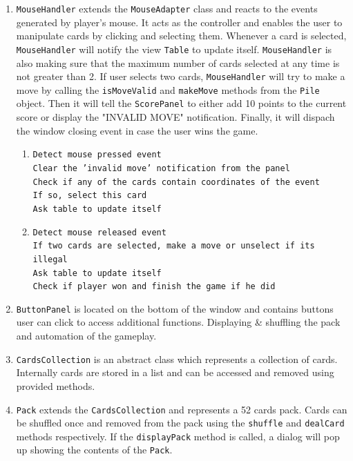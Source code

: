 \documentclass[a4paper, 11pt, titlepage]{article}
\begin{document}
\begin{enumerate}
	\item \texttt{MouseHandler} extends the \texttt{MouseAdapter} class and reacts to
		the events generated by player's mouse. It acts as the controller and enables the 
		user to manipulate cards by clicking and selecting them. Whenever a card is 
		selected, \texttt{MouseHandler} will notify the view \texttt{Table} to update 
		itself. \texttt{MouseHandler} is also making sure that the maximum number of 
		cards selected at any time is not greater than 2. If user selects two cards, 
		\texttt{MouseHandler} will try to make a move by calling the \texttt{isMoveValid}
		 and \texttt{makeMove} methods from the \texttt{Pile} object. Then it will 
		 tell the \texttt{ScorePanel} to either add 10 points to the current score or
		 display the "INVALID MOVE" notification. Finally, it will dispach the window 
		 closing event in case the user wins the game.
		 \begin{enumerate}
			 \item \texttt{Detect mouse pressed event\\
				Clear the 'invalid move' notification from the panel\\
				Check if any of the cards contain coordinates of the event\\
				If so, select this card\\
				Ask table to update itself
				}
			\item \texttt{Detect mouse released event\\
				If two cards are selected, make a move or unselect if its illegal\\
				Ask table to update itself\\
				Check if player won and finish the game if he did
				}
		\end{enumerate} 
		
	\item \texttt{ButtonPanel} is located on the bottom of the window and contains
		buttons user can click to access additional functions. Displaying
		\& shuffling the pack and automation of the gameplay. 
		
	\item \texttt{CardsCollection} is an abstract class which represents a collection of 
		cards. Internally cards are stored in a list and can be accessed and removed 
		using provided methods.
		
	\item \texttt{Pack} extends the \texttt{CardsCollection} and represents a 52 cards 
		pack. Cards can be shuffled once and removed from the pack using the 
		\texttt{shuffle} and \texttt{dealCard} methods respectively. If the 
		\texttt{displayPack} method is called, a dialog will pop up showing the contents 
		of the \texttt{Pack}.
	

\end{enumerate}
\end{document}
